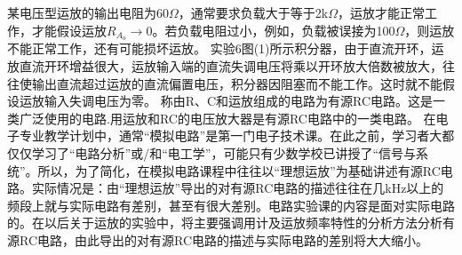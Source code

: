 \documentclass[a4paper]{article}
\begin{document}
某电压型运放的输出电阻为60$\Omega$，通常要求负载大于等于2k$\Omega$，运放才能正常工作，才能假设运放$R_{A_o}\to0$。若负载电阻过小，例如，负载被误接为100$\Omega$，则运放不能正常工作，还有可能损坏运放。
实验6图(1)所示积分器，由于直流开环，运放直流开环增益很大，运放输入端的直流失调电压将乘以开环放大倍数被放大，往往使输出直流超过运放的直流偏置电压，积分器因阻塞而不能工作。这时就不能假设运放输入失调电压为零。
称由R、C和运放组成的电路为有源RC电路。这是一类广泛使用的电路.用运放和RC的电压放大器是有源RC电路中的一类电路。
在电子专业教学计划中，通常“模拟电路”是第一门电子技术课。在此之前，学习者大都仅仅学习了“电路分析”或/和“电工学”，可能只有少数学校已讲授了“信号与系统”。所以，为了简化，在模拟电路课程中往往以“理想运放”为基础讲述有源RC电路。实际情况是：由“理想运放”导出的对有源RC电路的描述往往在几kHz以上的频段上就与实际电路有差别，甚至有很大差别。电路实验课的内容是面对实际电路的。在以后关于运放的实验中，将主要强调用计及运放频率特性的分析方法分析有源RC电路，由此导出的对有源RC电路的描述与实际电路的差别将大大缩小。
\end{document}
